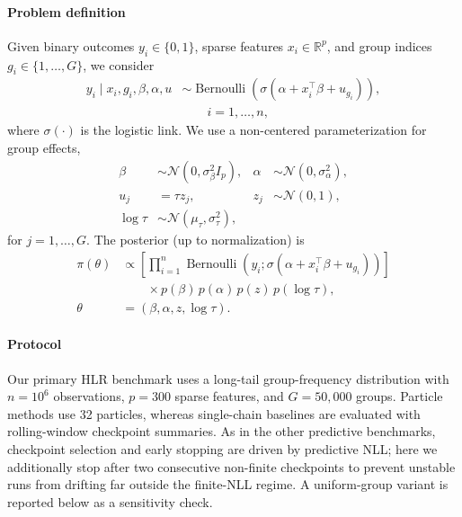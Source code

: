\paragraph{Problem definition}
Given binary outcomes $y_i\in\{0,1\}$, sparse features $x_i\in\mathbb{R}^p$, and
group indices $g_i\in\{1,\ldots,G\}$, we consider
\begin{equation}
\begin{aligned}
y_i \mid x_i,g_i,\beta,\alpha,u
&\sim \operatorname{Bernoulli}\!\left(
\sigma\!\left(\alpha + x_i^\top\beta + u_{g_i}\right)\right), \\
&\qquad i=1,\ldots,n,
\end{aligned}
\label{eq:hlr-likelihood}
\end{equation}
where $\sigma(\cdot)$ is the logistic link. We use a non-centered
parameterization for group effects,
\begin{equation}
\begin{aligned}
\beta &\sim \mathcal{N}(0,\sigma_\beta^2 I_p), &
\alpha &\sim \mathcal{N}(0,\sigma_\alpha^2), \\
u_j &= \tau z_j, &
z_j &\sim \mathcal{N}(0,1), \\
\log\tau &\sim \mathcal{N}(\mu_\tau,\sigma_\tau^2),
\end{aligned}
\label{eq:hlr-priors}
\end{equation}
for $j=1,\ldots,G$. The posterior (up to normalization) is
\begin{equation}
\begin{aligned}
\pi(\theta) &\propto
\left[\prod_{i=1}^{n}
\operatorname{Bernoulli}\!\left(
y_i;\sigma\!\left(\alpha+x_i^\top\beta+u_{g_i}\right)\right)\right] \\
&\qquad \times p(\beta)\,p(\alpha)\,p(z)\,p(\log\tau), \\
\theta &= (\beta,\alpha,z,\log\tau).
\end{aligned}
\label{eq:hlr-posterior}
\end{equation}

\paragraph{Protocol}
Our primary HLR benchmark uses a long-tail group-frequency distribution with
$n=10^6$ observations, $p=300$ sparse features, and $G=50{,}000$ groups. Particle methods use 32 particles, whereas single-chain
baselines are evaluated with rolling-window checkpoint summaries. As in the
other predictive benchmarks, checkpoint selection and early stopping are driven
by predictive NLL; here we additionally stop after two consecutive non-finite
checkpoints to prevent unstable runs from drifting far outside the finite-NLL
regime. A uniform-group variant is reported below as a sensitivity check.

